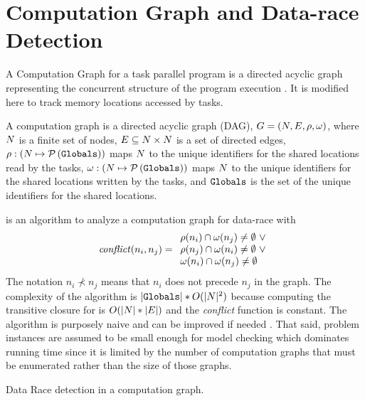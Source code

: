 \section{Computation Graph and Data-race Detection}
\label{sec:semantics}
A Computation Graph for a task parallel program is a directed acyclic
graph representing the concurrent structure of the program execution
\cite{dennis2012determinacy}.  It is modified here to track memory
locations accessed by tasks.

\begin{definition}
A computation graph is a directed acyclic graph (DAG), $G = \left( N, E, \rho, \omega \right)$, where $N$ is a finite
set of nodes, $E \subseteq N \times N$ is a set of
directed edges, $\rho : (N \mapsto \mathcal{P}\left(\mathtt{Globals}\right))$ maps $N$ to
the unique identifiers for the shared locations read by the tasks,
$\omega : (N \mapsto \mathcal{P}\left(\mathtt{Globals}\right))$ maps $N$ to the unique
identifiers for the shared locations written by the tasks, and $\mathtt{Globals}$
is the set of the unique identifiers for the shared locations.
\end{definition}

 is an algorithm to analyze a computation graph for data-race with
\[
\mathit{conflict}(n_i,n_j) = 
\begin{array}{l}
  \rho(n_i) \cap \omega(n_j) \neq \emptyset\ \vee \\
  \rho(n_j) \cap \omega(n_i) \neq \emptyset\  \vee \\
  \omega(n_i) \cap \omega(n_j) \neq \emptyset\  \\
\end{array}
\]
The notation $n_i \nprec n_j$ means that $n_i$ does not precede $n_j$
in the graph. The complexity of the algorithm is
$|\mathtt{Globals}|*O(|N|^2)$ because computing the transitive closure for
 is $O(|N|*|E|)$ and the \textit{conflict}
function is constant.  The algorithm is purposely naive and can be
improved if needed \cite{mellor1991fly,raman2012scalable}.  That said,
problem instances are assumed to be small enough for model checking
which dominates running time since it is limited by the number of
computation graphs that must be enumerated rather than the size of
those graphs.

\begin{algorithm}[t]
  \caption{Data Race detection in a computation graph.} \label{algo:drd}
\begin{algorithmic}[1]
  \label{loc:path} \label{loc:forall}
       \label{loc:datarace}
      \EndIf
\EndIf
 \EndFor
\EndFunction  
\end{algorithmic}
\end{algorithm}


